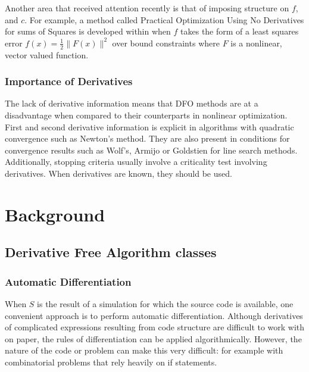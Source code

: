 \documentclass{article}
\begin{document}
Another area that received attention recently is that of imposing structure on $f$, and $c$.
For example, a method called Practical Optimization Using No Derivatives for sums of Squares
is developed within \cite{DUMMY:leastsquares} when $f$ takes the form of a least squares error
$f(x) = \frac 1 2 \|F(x)\|^2$ over bound constraints where $F$ is a nonlinear, vector valued function.




\subsubsection{Importance of Derivatives}

The lack of derivative information means that DFO methods are at a disadvantage when compared to their counterparts in nonlinear optimization.
First and second derivative information is explicit in algorithms with quadratic convergence such as Newton's method.
They are also present in conditions for convergence results such as Wolf's, Armijo or Goldstien for line search methods.
Additionally, stopping criteria usually involve a criticality test involving derivatives.
When derivatives are known, they should be used.

\subsection{}

\section{Background}
\subsection{Derivative Free Algorithm classes}
\subsubsection{Automatic Differentiation}

When $S$ is the result of a simulation for which the source code is available, one convenient approach is to perform automatic differentiation.
Although derivatives of complicated expressions resulting from code structure are difficult to work with on paper, the rules of differentiation can be applied algorithmically.
However, the nature of the code or problem can make this very difficult: for example with combinatorial problems that rely heavily on if statements.
\end{document}
